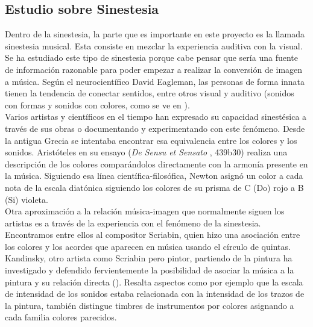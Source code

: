 \subsection{Estudio sobre Sinestesia}
\label{subsubsec:estudioSinestesia}



Dentro de la sinestesia, la parte que es importante en este proyecto es la llamada sinestesia musical. Esta consiste en mezclar la experiencia auditiva con la visual. Se ha estudiado este tipo de sinestesia porque cabe pensar que sería una fuente de información razonable para poder empezar a realizar la conversión de imagen a música.
Según el neurocientífico David Eagleman, las personas de forma innata tienen la tendencia de conectar sentidos, entre otros visual y auditivo (sonidos con formas y sonidos con colores, como se ve en \cite{VideoRedesFliparColores}).\\

Varios artistas y científicos en el tiempo han expresado su capacidad sinestésica a través de sus obras o documentando y experimentando con este fenómeno. Desde la antigua Grecia se intentaba encontrar esa equivalencia entre los colores y los sonidos. Aristóteles en su ensayo (\emph{De Sensu et Sensato} \cite{DeSensuEtSensato}, 439b30) realiza una descripción de los colores comparándolos directamente con la armonía presente en la música. Siguiendo esa línea científica-filosófica, Newton asignó un color a cada nota de la escala diatónica siguiendo los colores de su prisma de C (Do) rojo a B (Si) violeta.\\

Otra aproximación a la relación música-imagen que normalmente siguen los artistas es a través de la experiencia con el fenómeno de la sinestesia. Encontramos entre ellos al compositor Scriabin, quien hizo una asociación entre los colores y los acordes que aparecen en música usando el círculo de quintas. Kandinsky, otro artista como Scriabin pero pintor, partiendo de la pintura ha investigado y defendido fervientemente la posibilidad de asociar la música a la pintura y su relación directa (\cite{ConcerningSpiritualArt}). Resalta aspectos como por ejemplo que la escala de intensidad de los sonidos estaba relacionada con la intensidad de los trazos de la pintura, también distingue timbres de instrumentos por colores asignando a cada familia colores parecidos.\\


